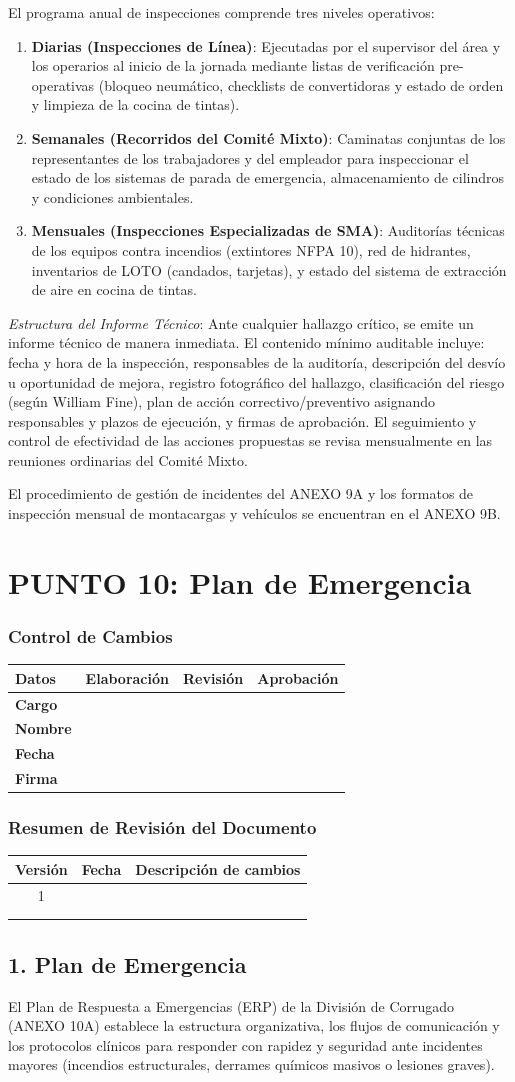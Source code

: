\documentclass[11pt, letterpaper]{article}
\newcommand{\controlcambios}{
    \subsubsection*{Control de Cambios}
    \begin{table}[H]
        \centering
        \small
        \begin{tabular}{lp{4cm}p{4cm}p{4cm}}
            \toprule
            \textbf{Datos} & \textbf{Elaboración} & \textbf{Revisión} & \textbf{Aprobación} \\
            \midrule
            \textbf{Cargo} & & & \\
            \textbf{Nombre} & & & \\
            \textbf{Fecha} & & & \\
            \textbf{Firma} & & & \\
            \bottomrule
        \end{tabular}
    \end{table}
}
\newcommand{\resumenrevision}[1]{
    \subsubsection*{Resumen de Revisión del Documento}
    \begin{table}[H]
        \centering
        \small
        \begin{tabular}{ccp{8cm}}
            \toprule
            \textbf{Versión} & \textbf{Fecha} & \textbf{Descripción de cambios} \\
            \midrule
            #1 & & \\
            & & \\
            & & \\
            \bottomrule
        \end{tabular}
    \end{table}
}
\begin{document}
El programa anual de inspecciones comprende tres niveles operativos:
\begin{enumerate}
    \item \textbf{Diarias (Inspecciones de Línea)}: Ejecutadas por el supervisor del área y los operarios al inicio de la jornada mediante listas de verificación pre-operativas (bloqueo neumático, checklists de convertidoras y estado de orden y limpieza de la cocina de tintas).
    \item \textbf{Semanales (Recorridos del Comité Mixto)}: Caminatas conjuntas de los representantes de los trabajadores y del empleador para inspeccionar el estado de los sistemas de parada de emergencia, almacenamiento de cilindros y condiciones ambientales.
    \item \textbf{Mensuales (Inspecciones Especializadas de SMA)}: Auditorías técnicas de los equipos contra incendios (extintores NFPA 10), red de hidrantes, inventarios de LOTO (candados, tarjetas), y estado del sistema de extracción de aire en cocina de tintas.
\end{enumerate}

\textit{Estructura del Informe Técnico}: Ante cualquier hallazgo crítico, se emite un informe técnico de manera inmediata. El contenido mínimo auditable incluye: fecha y hora de la inspección, responsables de la auditoría, descripción del desvío u oportunidad de mejora, registro fotográfico del hallazgo, clasificación del riesgo (según William Fine), plan de acción correctivo/preventivo asignando responsables y plazos de ejecución, y firmas de aprobación. El seguimiento y control de efectividad de las acciones propuestas se revisa mensualmente en las reuniones ordinarias del Comité Mixto.

El procedimiento de gestión de incidentes del ANEXO 9A y los formatos de inspección mensual de montacargas y vehículos se encuentran en el ANEXO 9B.
\newpage
\section{PUNTO 10: Plan de Emergencia}
\controlcambios
\resumenrevision{1}
\subsection{1. Plan de Emergencia}
El Plan de Respuesta a Emergencias (ERP) de la División de Corrugado (ANEXO 10A) establece la estructura organizativa, los flujos de comunicación y los protocolos clínicos para responder con rapidez y seguridad ante incidentes mayores (incendios estructurales, derrames químicos masivos o lesiones graves).
\end{document}
